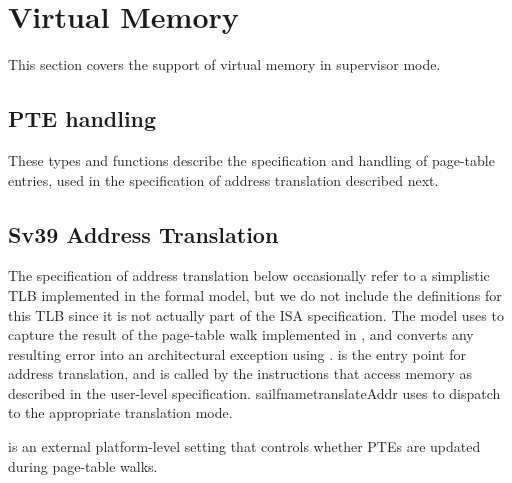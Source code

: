 \section{Virtual Memory}
\label{s:priv-sail-vmem}

This section covers the support of virtual memory in supervisor mode.

\subsection{PTE handling}
\label{ss:priv-sail-ptes}

These types and functions describe the specification and handling of
page-table entries, used in the specification of address translation
described next.

\begin{formalspec}
  \sailtypepteAttribs
  \sailtypePTEBits
  \sailfnisPTEPtr
  \sailfnisInvalidPTE
  \sailfncheckPTEPermission
  \sailfnupdatePTEBits
\end{formalspec}

\subsection{Sv39 Address Translation}
\label{ss:priv-sail-addr-trans}

The specification of address translation below occasionally refer to a
simplistic TLB implemented in the formal model, but we do not include
the definitions for this TLB since it is not actually part of the ISA
specification.  The model uses  to capture the
result of the page-table walk implemented in , and
converts any resulting error into an architectural exception using
.  is the
entry point for address translation, and is called by the instructions
that access memory as described in the user-level specification.
sailfname{translateAddr} uses  to dispatch
to the appropriate translation mode.

 is an external platform-level
setting that controls whether PTEs are updated during page-table
walks.

\begin{formalspec}
  \sailtypePTWError
  \sailtypePTWResult
  \sailfntranslationException
  \sailfnwalkThreeNine
  \sailfntranslateThreeNine
  \sailfntranslationMode
  \sailtypeTRResult
  \sailfntranslateAddr
\end{formalspec}

